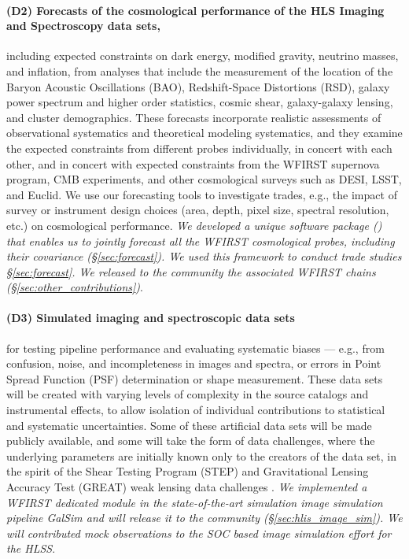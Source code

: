 \paragraph*{(D2) Forecasts of the cosmological performance of the HLS Imaging
and Spectroscopy data sets,} including expected constraints on dark energy,
modified gravity, neutrino masses, and inflation, from analyses that include the
measurement of the location of the Baryon Acoustic Oscillations (BAO),
Redshift-Space Distortions (RSD), galaxy power spectrum and higher order
statistics, cosmic shear, galaxy-galaxy lensing, and cluster demographics. These
forecasts incorporate realistic assessments of observational systematics and
theoretical modeling systematics, and they examine the expected constraints from
different probes individually, in concert with each other, and in concert with
expected constraints from the WFIRST supernova program, CMB experiments, and
other cosmological surveys such as DESI, LSST, and Euclid. We use our
forecasting tools to investigate trades, e.g., the impact of survey or
instrument design choices (area, depth, pixel size, spectral resolution, etc.)
on cosmological performance. \emph{We developed a unique software package (\CoLi) that
enables us to jointly forecast all the WFIRST cosmological probes, including
their covariance (\S \ref{sec:forecast}). We used this framework to conduct trade studies \S\ref{sec:forecast}. We released to the community the
associated WFIRST chains (\S \ref{sec:other_contributions})}.

\paragraph*{(D3) Simulated imaging and spectroscopic data sets} for testing pipeline
performance and evaluating systematic biases --- e.g., from confusion,
noise, and incompleteness in images and spectra, or errors in Point
Spread Function (PSF) determination or shape measurement.
These data sets will be created with varying levels of complexity
in the source catalogs and instrumental effects, to allow isolation
of individual contributions to statistical and systematic uncertainties.
Some of these artificial data sets will be made publicly available,
and some will take the form of data challenges, where the underlying
parameters are initially known only to the creators of the data set,
in the spirit of the Shear Testing Program (STEP) and Gravitational
Lensing Accuracy Test (GREAT) weak lensing data
challenges \cite{Heymans2006, Massey2007, Bridle2010, Kitching2012, Mandelbaum2015}. \emph{We implemented a WFIRST dedicated module in the state-of-the-art simulation image simulation pipeline GalSim and will release it to the community (\S \ref{sec:hlis_image_sim}). We will contributed mock observations to the SOC based image simulation effort for the HLSS}.

